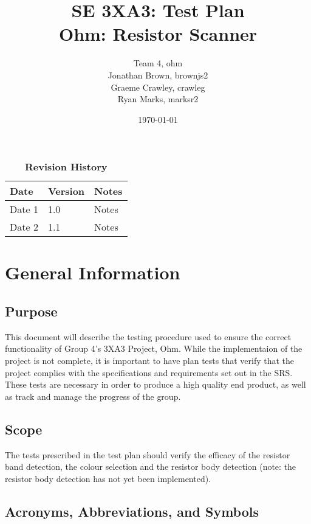 \documentclass[12pt, titlepage]{article}
\title{SE 3XA3: Test Plan\\ Ohm: Resistor Scanner}
\author{Team 4, ohm
		\\ Jonathan Brown, brownjs2
		\\ Graeme Crawley, crawleg
		\\ Ryan Marks, marksr2
}
\date{\today}
\begin{document}
\maketitle
{}
\tableofcontents
\listoftables
\listoffigures
\begin{table}[bp]
\caption{\bf Revision History}
\begin{tabularx}{\textwidth}{p{3cm}p{2cm}X}
\toprule {\bf Date} & {\bf Version} & {\bf Notes}\\
\midrule
Date 1 & 1.0 & Notes\\
Date 2 & 1.1 & Notes\\
\bottomrule
\end{tabularx}
\end{table}
\newpage
{}
\section{General Information}
\subsection{Purpose}
\par This document will describe the testing procedure used to ensure the correct functionality of Group 4's 3XA3 Project, Ohm. While the implementaion of the project is not complete, it is important to have plan tests that verify that the project complies with the specifications and requirements set out in the SRS. These tests are necessary in order to produce a high quality end product, as well as track and manage the progress of the group.
\subsection{Scope}
\par The tests prescribed in the test plan should verify the efficacy of the resistor band detection, the colour selection and the resistor body detection (note: the resistor body detection has not yet been implemented).
\subsection{Acronyms, Abbreviations, and Symbols}
	
\end{document}
